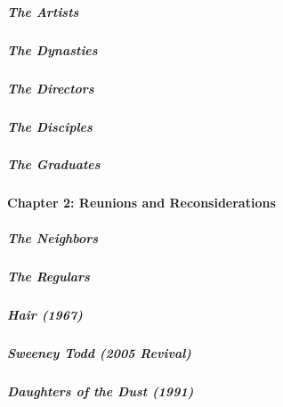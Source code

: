 \hypertarget{the-artists}{%
\subparagraph{The Artists}\label{the-artists}}

\href{/interactive/2020/04/13/t-magazine/italian-fashion-design-houses.html}{}

\hypertarget{the-dynasties}{%
\subparagraph{The Dynasties}\label{the-dynasties}}

\href{/interactive/2020/04/13/t-magazine/gordon-parks.html}{}

\hypertarget{the-directors}{%
\subparagraph{The Directors}\label{the-directors}}

\href{/interactive/2020/04/13/t-magazine/enrique-olvera-chef.html}{}

\hypertarget{the-disciples}{%
\subparagraph{The Disciples}\label{the-disciples}}

\href{/interactive/2020/04/13/t-magazine/royal-academy-antwerp.html}{}

\hypertarget{the-graduates}{%
\subparagraph{The Graduates}\label{the-graduates}}

\hypertarget{chapter-2-reunions-and-reconsiderations}{%
\paragraph{Chapter 2: Reunions and
Reconsiderations}\label{chapter-2-reunions-and-reconsiderations}}

\href{/interactive/2020/04/13/t-magazine/ninth-street-greenwich-village-neighbors.html}{}

\hypertarget{the-neighbors}{%
\subparagraph{The Neighbors}\label{the-neighbors}}

\href{/interactive/2020/04/13/t-magazine/omen-restaurant-nyc.html}{}

\hypertarget{the-regulars}{%
\subparagraph{The Regulars}\label{the-regulars}}

\href{/interactive/2020/04/13/t-magazine/hair-musical-broadway.html}{}

\hypertarget{hair-1967}{%
\subparagraph{Hair (1967)}\label{hair-1967}}

\href{/interactive/2020/04/13/t-magazine/sweeney-todd-revival.html}{}

\hypertarget{sweeney-todd-2005-revival}{%
\subparagraph{Sweeney Todd (2005
Revival)}\label{sweeney-todd-2005-revival}}

\href{/interactive/2020/04/13/t-magazine/daughters-of-the-dust.html}{}

\hypertarget{daughters-of-the-dust-1991}{%
\subparagraph{Daughters of the Dust
(1991)}\label{daughters-of-the-dust-1991}}

